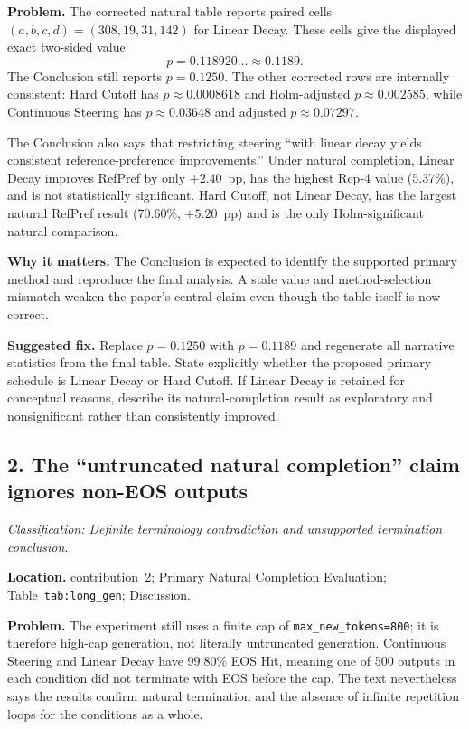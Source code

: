 \documentclass[11pt]{article}
\newcommand{\findinglabel}[1]{\textbf{#1}}
\newcommand{\classification}[1]{\textit{Classification: #1.}}
\begin{document}
\findinglabel{Problem.} The corrected natural table reports paired cells $(a,b,c,d)=(308,19,31,142)$ for Linear Decay.  These cells give the displayed exact two-sided value
\[
p=0.118920\ldots\approx0.1189.
\]
The Conclusion still reports $p=0.1250$.  The other corrected rows are internally consistent: Hard Cutoff has $p\approx0.0008618$ and Holm-adjusted $p\approx0.002585$, while Continuous Steering has $p\approx0.03648$ and adjusted $p\approx0.07297$.

The Conclusion also says that restricting steering ``with linear decay yields consistent reference-preference improvements.''  Under natural completion, Linear Decay improves RefPref by only $+2.40$~pp, has the highest Rep-4 value (5.37\%), and is not statistically significant.  Hard Cutoff, not Linear Decay, has the largest natural RefPref result (70.60\%, $+5.20$~pp) and is the only Holm-significant natural comparison.

\findinglabel{Why it matters.} The Conclusion is expected to identify the supported primary method and reproduce the final analysis.  A stale value and method-selection mismatch weaken the paper's central claim even though the table itself is now correct.

\findinglabel{Suggested fix.} Replace $p=0.1250$ with $p=0.1189$ and regenerate all narrative statistics from the final table.  State explicitly whether the proposed primary schedule is Linear Decay or Hard Cutoff.  If Linear Decay is retained for conceptual reasons, describe its natural-completion result as exploratory and nonsignificant rather than consistently improved.

\subsection*{2. The ``untruncated natural completion'' claim ignores non-EOS outputs}

\classification{Definite terminology contradiction and unsupported termination conclusion}

\findinglabel{Location.} contribution~2; Primary Natural Completion Evaluation; Table~\texttt{tab:long\_gen}; Discussion.

\findinglabel{Problem.} The experiment still uses a finite cap of \texttt{max\_new\_tokens=800}; it is therefore high-cap generation, not literally untruncated generation.  Continuous Steering and Linear Decay have 99.80\% EOS Hit, meaning one of 500 outputs in each condition did not terminate with EOS before the cap.  The text nevertheless says the results confirm natural termination and the absence of infinite repetition loops for the conditions as a whole.
\end{document}
